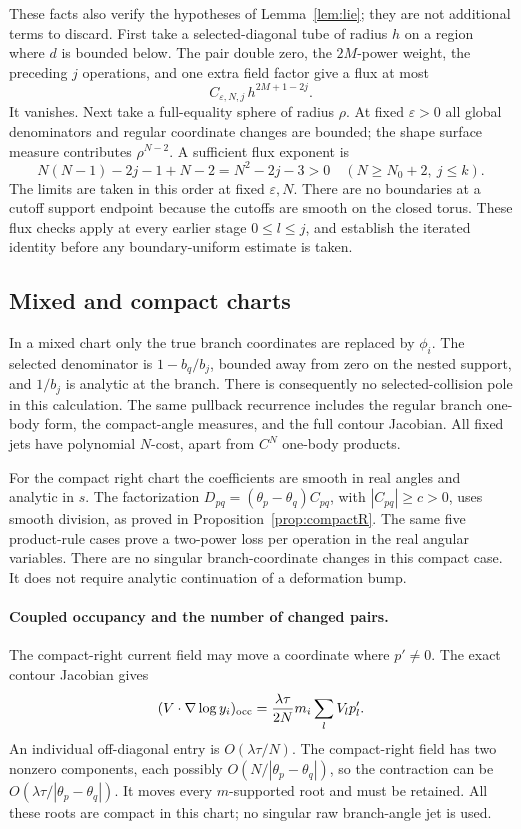 \documentclass[11pt]{article}
\numberwithin{equation}{section}
\theoremstyle{definition}
\newcommand{\eps}{\varepsilon}
\begin{document}
These facts also verify the hypotheses of Lemma~\ref{lem:lie};
they are not additional terms to discard.
First take a selected-diagonal tube of radius \(h\) on a region
where \(d\) is bounded below. The pair double zero, the
\(2M\)-power weight, the preceding \(j\) operations, and one
extra field factor give a flux at most
\[
 C_{\eps,N,j}\,h^{2M+1-2j}.
\]
It vanishes. Next take a full-equality sphere of radius \(\rho\).
At fixed \(\eps>0\) all global denominators and regular coordinate
changes are bounded; the shape surface measure contributes
\(\rho^{N-2}\). A sufficient flux exponent is
\[
 N(N-1)-2j-1+N-2=N^2-2j-3>0
 \quad(N\ge N_0+2,\ j\le k).
\]
The limits are taken in this order at fixed \(\eps,N\).
There are no boundaries at a cutoff support endpoint because
the cutoffs are smooth on the closed torus. These flux checks
apply at every earlier stage \(0\le l\le j\), and establish the
iterated identity before any boundary-uniform estimate is taken.

\subsection{Mixed and compact charts}
In a mixed chart only the true branch coordinates are replaced
by \(\phi_i\). The selected denominator is \(1-b_q/b_j\), bounded
away from zero on the nested support, and \(1/b_j\) is analytic
at the branch. There is consequently no selected-collision pole
in this calculation. The same pullback recurrence includes the
regular branch one-body form, the compact-angle measures, and
the full contour Jacobian. All fixed jets have polynomial
\(N\)-cost, apart from \(C^N\) one-body products.

For the compact right chart the coefficients are smooth in real
angles and analytic in \(s\). The factorization
\(D_{pq}=(\theta_p-\theta_q)C_{pq}\), with \(|C_{pq}|\ge c>0\),
uses smooth division, as proved in Proposition~\ref{prop:compactR}.
The same five product-rule cases prove a two-power loss per
operation in the real angular variables. There are no singular
branch-coordinate changes in this compact case. It does not
require analytic continuation of a deformation bump.

\paragraph{Coupled occupancy and the number of changed pairs.}
The compact-right current field may move a coordinate where
\(p'\ne0\). The exact contour Jacobian gives
\[
 (V\cdot\nabla\log y_i)_{\rm occ}
   =\frac{\lambda\tau}{2N}m_i\sum_l V_l p'_l.
\]
An individual off-diagonal entry is \(O(\lambda\tau/N)\).
The compact-right field has two nonzero components, each possibly
\(O(N/|\theta_p-\theta_q|)\), so the contraction can be
\(O(\lambda\tau/|\theta_p-\theta_q|)\). It moves every
\(m\)-supported root and must be retained. All these roots are
compact in this chart; no singular raw branch-angle jet is used.
\end{document}

